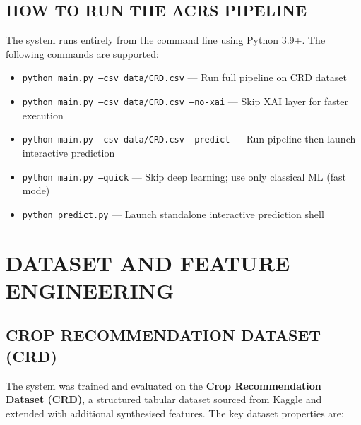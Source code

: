 \documentclass[12pt,a4paper,oneside]{report}
\begin{document}
\section{HOW TO RUN THE ACRS PIPELINE}

The system runs entirely from the command line using Python 3.9+. The following commands are supported:

\begin{singlespacing}
\begin{itemize}[leftmargin=*, label=$\bullet$]
  \item \texttt{python main.py --csv data/CRD.csv} --- Run full pipeline on CRD dataset
  \item \texttt{python main.py --csv data/CRD.csv --no-xai} --- Skip XAI layer for faster execution
  \item \texttt{python main.py --csv data/CRD.csv --predict} --- Run pipeline then launch interactive prediction
  \item \texttt{python main.py --quick} --- Skip deep learning; use only classical ML (fast mode)
  \item \texttt{python predict.py} --- Launch standalone interactive prediction shell
\end{itemize}
\end{singlespacing}

\chapter{DATASET AND FEATURE ENGINEERING}

\section{CROP RECOMMENDATION DATASET (CRD)}

The system was trained and evaluated on the \textbf{Crop Recommendation Dataset (CRD)}, a structured tabular dataset sourced from Kaggle and extended with additional synthesised features. The key dataset properties are:
\end{document}

